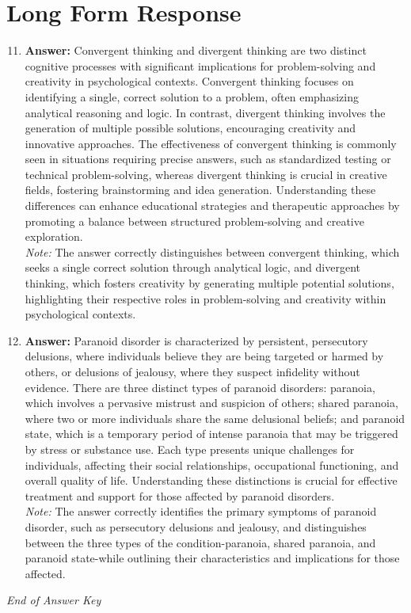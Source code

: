 \documentclass[12pt]{article}
\begin{document}
\section*{Long Form Response}
\begin{enumerate}[label=\arabic*.]
\setcounter{enumi}{10}
\item \textbf{Answer:} Convergent thinking and divergent thinking are two distinct cognitive processes with significant implications for problem-solving and creativity in psychological contexts. Convergent thinking focuses on identifying a single, correct solution to a problem, often emphasizing analytical reasoning and logic. In contrast, divergent thinking involves the generation of multiple possible solutions, encouraging creativity and innovative approaches. The effectiveness of convergent thinking is commonly seen in situations requiring precise answers, such as standardized testing or technical problem-solving, whereas divergent thinking is crucial in creative fields, fostering brainstorming and idea generation. Understanding these differences can enhance educational strategies and therapeutic approaches by promoting a balance between structured problem-solving and creative exploration.
\\ \textit{Note:} The answer correctly distinguishes between convergent thinking, which seeks a single correct solution through analytical logic, and divergent thinking, which fosters creativity by generating multiple potential solutions, highlighting their respective roles in problem-solving and creativity within psychological contexts.
\item \textbf{Answer:} Paranoid disorder is characterized by persistent, persecutory delusions, where individuals believe they are being targeted or harmed by others, or delusions of jealousy, where they suspect infidelity without evidence. There are three distinct types of paranoid disorders: paranoia, which involves a pervasive mistrust and suspicion of others; shared paranoia, where two or more individuals share the same delusional beliefs; and paranoid state, which is a temporary period of intense paranoia that may be triggered by stress or substance use. Each type presents unique challenges for individuals, affecting their social relationships, occupational functioning, and overall quality of life. Understanding these distinctions is crucial for effective treatment and support for those affected by paranoid disorders.
\\ \textit{Note:} The answer correctly identifies the primary symptoms of paranoid disorder, such as persecutory delusions and jealousy, and distinguishes between the three types of the condition-paranoia, shared paranoia, and paranoid state-while outlining their characteristics and implications for those affected.
\end{enumerate}

\vfill
\noindent\textit{End of Answer Key}
\end{document}
